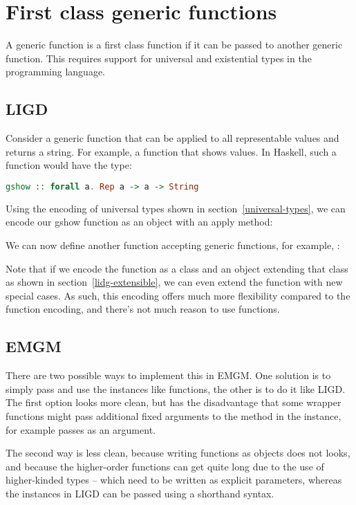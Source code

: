 \section{First class generic functions}

A generic function is a first class function if it can be passed to another
generic function. This requires support for universal and existential types in the programming
language.

\subsection{LIGD}

Consider a generic function that can be applied to all representable values
and returns a string. For example, a function  that shows values.
In Haskell, such a function would have the type:
\begin{lstlisting}[language=Haskell]
gshow :: forall a. Rep a -> a -> String
\end{lstlisting}

Using the encoding of universal types shown in section~\ref{universal-types},
we can encode our gshow function as an object with an apply method:

We can now define another function accepting generic functions, for example, :


Note that if we encode the function as a class and an object extending that
class as shown in section~\ref{lidg-extensible}, we can even extend the
function with new special cases. As such, this encoding offers much more
flexibility compared to the function encoding, and there's not much reason
to use functions.

\subsection{EMGM}
There are two possible ways to implement this in EMGM. One solution is to
simply pass and use the  instances like functions, the other is to do it
like LIGD. The first option looks more clean, but has the disadvantage that
some wrapper functions might pass additional fixed arguments to the method
in the  instance,  for example passes  as
an argument.

The second way is less clean, because writing functions as objects
does not looks, and because the higher-order functions can get quite long due to the
use of higher-kinded types -- which need to be written as explicit parameters,
whereas the  instances in LIGD can be passed using a shorthand syntax.

